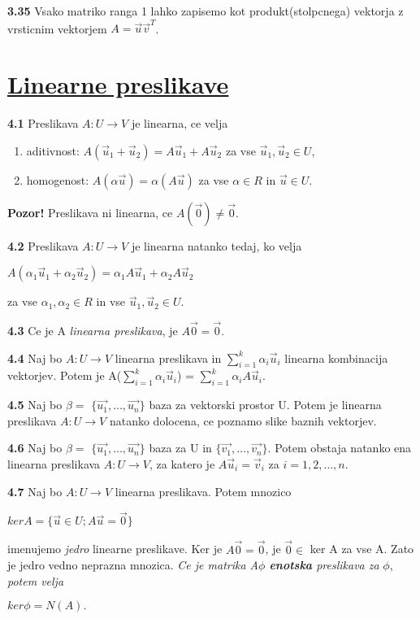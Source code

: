 \documentclass{article}
\begin{document}
\begin{multicols}{3}
\textbf{3.35} Vsako matriko ranga 1 lahko zapisemo kot produkt(stolpcnega) vektorja z vrsticnim
vektorjem $A = \vec{u}\vec{v}^{T}$.

\section{\underline{Linearne preslikave}}

\textbf{4.1} Preslikava $A: U \rightarrow V$ je linearna, ce velja
\begin{enumerate}
    \item aditivnost: $A(\vec{u}_{1} + \vec{u}_{2}) = A\vec{u}_{1} + A\vec{u}_{2}$ za vse $\vec{u}_{1}, \vec{u}_{2} \in U$,
    \item homogenost: $A(\alpha \vec{u}) = \alpha(A\vec{u})$ za vse $\alpha \in R$ in $\vec{u} \in U$.
\end{enumerate}
\textbf{Pozor!} Preslikava ni linearna, ce $A(\vec{0}) \neq  \vec{0}$.

\textbf{4.2} Preslikava $A: U \rightarrow V$ je linearna natanko tedaj, ko velja
\begin{center}
    $A(\alpha_{1}\vec{u}_{1} + \alpha_{2}\vec{u}_{2}) = \alpha_{1}A\vec{u}_{1} + \alpha_{2}A\vec{u}_{2}$
\end{center}
za vse $\alpha_{1}, \alpha_{2} \in R$ in vse $\vec{u}_{1}, \vec{u}_{2} \in U$.

\textbf{4.3} Ce je A \textit{linearna preslikava}, je $A\vec{0} = \vec{0}$.

\textbf{4.4} Naj bo $A: U \rightarrow V$ linearna preslikava in $\sum_{i=1}^{k} \alpha_{i}\vec{u}_{i}$
linearna kombinacija vektorjev. Potem je A($\sum_{i=1}^{k} \alpha_{i}\vec{u}_{i}$) = $\sum_{i=1}^{k} \alpha_{i}A\vec{u}_{i}$.

\textbf{4.5} Naj bo $\beta =$ $\{ \vec{u_{1}}, \dots,\vec{u_{n}}\}$ baza za vektorski prostor U. Potem je linearna
preslikava $A: U \rightarrow V$ natanko dolocena, ce poznamo slike baznih vektorjev.

\textbf{4.6} Naj bo $\beta =$ $\{\vec{u_{1}}, \dots,\vec{u_{n}}\}$ baza za U in $\{\vec{v_{1}}, \dots,\vec{v_{n}}\}$.
Potem obstaja natanko ena linearna preslikava $A: U \rightarrow V$, za katero je $A\vec{u}_{i} = \vec{v}_{i}$ za $i = 1, 2, \dots, n$.

\textbf{4.7} Naj bo $A: U \rightarrow V$ linearna preslikava. Potem mnozico
\begin{center}
    $ker A = \{ \vec{u} \in U; A\vec{u} = \vec{0}\}$
\end{center}
imenujemo \textit{jedro} linearne preslikave. Ker je $A\vec{0} = \vec{0}$, je $\vec{0} \in$ ker A za vse A.
Zato je jedro vedno neprazna mnozica.
\textit{Ce je matrika A$\phi$ \textbf{enotska} preslikava za } $\phi$, \textit{potem velja}
\begin{center}
    \begin{math}
        ker \phi = N(A).
    \end{math}
\end{center}


\end{multicols}
\end{document}
